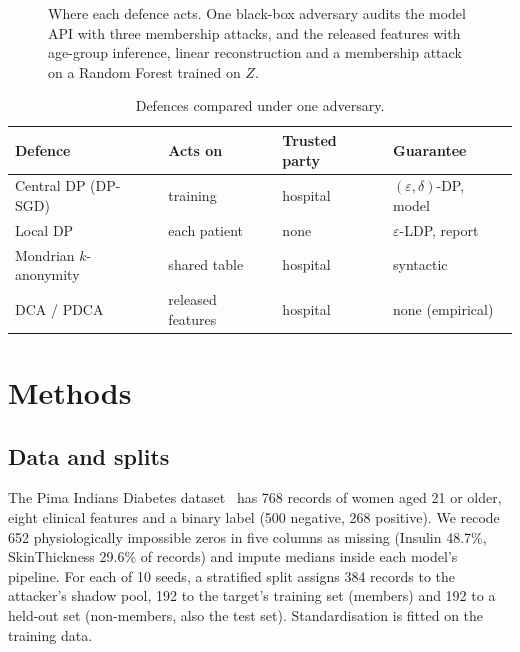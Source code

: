 \documentclass[conference]{IEEEtran}
\newcommand{\eps}{\varepsilon}
\begin{document}
\begin{figure}[t]
\centering
\resizebox{0.97\textwidth}{!}{}
\caption{Where each defence acts. One black-box adversary audits the model API with three membership attacks, and the released features with age-group inference, linear reconstruction and a membership attack on a Random Forest trained on $Z$.}
\label{fig:pipeline}
\end{figure}

\begin{table}[t]
\centering\footnotesize
\caption{Defences compared under one adversary.}
\label{tab:defences}
\setlength{\tabcolsep}{3pt}
\begin{tabular}{@{}llll@{}}
\toprule
Defence & Acts on & Trusted party & Guarantee \\
\midrule
Central DP (DP-SGD) & training & hospital & $(\eps,\delta)$-DP, model \\
Local DP & each patient & none & $\eps$-LDP, report \\
Mondrian $k$-anonymity & shared table & hospital & syntactic \\
DCA / PDCA & released features & hospital & none (empirical) \\
\bottomrule
\end{tabular}
\end{table}

\section{Methods}
\subsection{Data and splits}
The Pima Indians Diabetes dataset~\cite{smith1988} has 768 records of women aged 21 or older, eight clinical features and a binary label (500 negative, 268 positive). We recode 652 physiologically impossible zeros in five columns as missing (Insulin 48.7\%, SkinThickness 29.6\% of records) and impute medians inside each model's pipeline. For each of 10 seeds, a stratified split assigns 384 records to the attacker's shadow pool, 192 to the target's training set (members) and 192 to a held-out set (non-members, also the test set). Standardisation is fitted on the training data.
\end{document}
